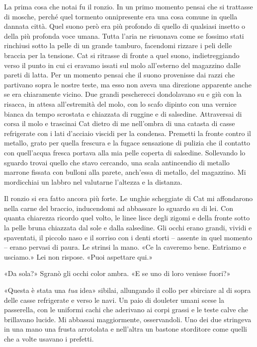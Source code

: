 La prima cosa che notai fu il ronzio. In un primo momento pensai che si
trattasse di mosche, perché quel tormento onnipresente era una cosa
comune in quella dannata città. Quel suono però era più profondo di
quello di qualsiasi insetto o della più profonda voce umana. Tutta
l'aria ne risuonava come se fossimo stati rinchiusi sotto la pelle di un
grande tamburo, facendomi rizzare i peli delle braccia per la tensione.
Cat si ritrasse di fronte a quel suono, indietreggiando verso il punto
in cui ci eravamo issati sul molo all'esterno del magazzino dalle pareti
di latta. Per un momento pensai che il suono provenisse dai razzi che
partivano sopra le nostre teste, ma esso non aveva una direzione
apparente anche se era chiaramente vicino. Due grandi pescherecci
dondolavano su e giù con la risacca, in attesa all'estremità del molo,
con lo scafo dipinto con una vernice bianca da tempo scrostata e
chiazzata di ruggine e di salsedine. Attraversai di corsa il molo e
trascinai Cat dietro di me nell'ombra di una catasta di casse
refrigerate con i lati d'acciaio viscidi per la condensa. Premetti la
fronte contro il metallo, grato per quella frescura e la fugace
sensazione di pulizia che il contatto con quell'acqua fresca portava
alla mia pelle coperta di salsedine. Sollevando lo sguardo trovai quello
che stavo cercando, una scala antincendio di metallo marrone fissata con
bulloni alla parete, anch'essa di metallo, del magazzino. Mi mordicchiai
un labbro nel valutarne l'altezza e la distanza.

Il ronzio si era fatto ancora più forte. Le unghie scheggiate di Cat mi
affondarono nella carne del braccio, inducendomi ad abbassare lo sguardo
su di lei. Con quanta chiarezza ricordo quel volto, le linee lisce degli
zigomi e della fronte sotto la pelle bruna chiazzata dal sole e dalla
salsedine. Gli occhi erano grandi, vividi e spaventati, il piccolo naso
e il sorriso con i denti storti -- assente in quel momento -- erano
pervasi di paura. Le strinsi la mano. «Ce la caveremo bene. Entriamo e
usciamo.» Lei non rispose. «Puoi aspettare qui.»

«Da sola?» Sgranò gli occhi color ambra. «E se uno di loro venisse
fuori?»

«Questa è stata una \emph{tua} idea» sibilai, allungando il collo per
sbirciare al di sopra delle casse refrigerate e verso le navi. Un paio
di douleter umani scese la passerella, con le uniformi cachi che
aderivano ai corpi grassi e le teste calve che brillavano lucide. Mi
abbassai maggiormente, osservandoli. Uno dei due stringeva in una mano
una frusta arrotolata e nell'altra un bastone storditore come quelli che
a volte usavano i prefetti.

